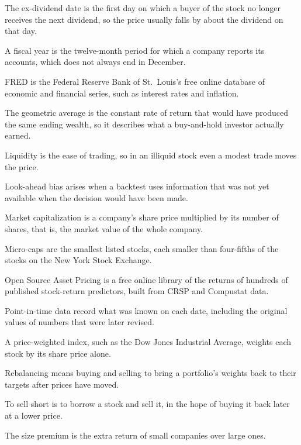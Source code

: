 \begin{keyterms}
\begin{description}[leftmargin=0pt, itemsep=2pt, parsep=0pt, font=\normalfont\bfseries\color{FEMaroon}]
  \item[Ex-dividend date.] The ex-dividend date is the first day on which a buyer of the stock no longer receives the next dividend, so the price usually falls by about the dividend on that day.
  \item[Fiscal year.] A fiscal year is the twelve-month period for which a company reports its accounts, which does not always end in December.
  \item[FRED.] FRED is the Federal Reserve Bank of St.~Louis's free online database of economic and financial series, such as interest rates and inflation.
  \item[Geometric average.] The geometric average is the constant rate of return that would have produced the same ending wealth, so it describes what a buy-and-hold investor actually earned.
  \item[Liquidity.] Liquidity is the ease of trading, so in an illiquid stock even a modest trade moves the price.
  \item[Look-ahead bias.] Look-ahead bias arises when a backtest uses information that was not yet available when the decision would have been made.
  \item[Market capitalization.] Market capitalization is a company's share price multiplied by its number of shares, that is, the market value of the whole company.
  \item[Micro-caps.] Micro-caps are the smallest listed stocks, each smaller than four-fifths of the stocks on the New York Stock Exchange.
  \item[Open Source Asset Pricing.] Open Source Asset Pricing is a free online library of the returns of hundreds of published stock-return predictors, built from CRSP and Compustat data.
  \item[Point-in-time data.] Point-in-time data record what was known on each date, including the original values of numbers that were later revised.
  \item[Price-weighted.] A price-weighted index, such as the Dow Jones Industrial Average, weights each stock by its share price alone.
  \item[Rebalancing.] Rebalancing means buying and selling to bring a portfolio's weights back to their targets after prices have moved.
  \item[Short selling.] To sell short is to borrow a stock and sell it, in the hope of buying it back later at a lower price.
  \item[Size premium.] The size premium is the extra return of small companies over large ones.

\end{description}
\end{keyterms}
